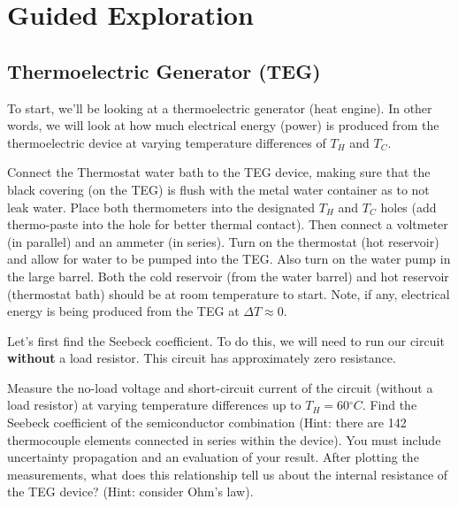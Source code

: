 \documentclass[
  letterpaper,
  DIV=11,
  numbers=noendperiod]{scrreprt}
\begin{document}

\hypertarget{guided-exploration}{%
\chapter{Guided Exploration}\label{guided-exploration}}

\hypertarget{thermoelectric-generator-teg}{%
\section{Thermoelectric Generator
(TEG)}\label{thermoelectric-generator-teg}}

To start, we'll be looking at a thermoelectric generator (heat engine).
In other words, we will look at how much electrical energy (power) is
produced from the thermoelectric device at varying temperature
differences of \(T_{H}\) and \(T_{C}\).

Connect the Thermostat water bath to the TEG device, making sure that
the black covering (on the TEG) is flush with the metal water container
as to not leak water. Place both thermometers into the designated
\(T_{H}\) and \(T_{C}\) holes (add thermo-paste into the hole for better
thermal contact). Then connect a voltmeter (in parallel) and an ammeter
(in series). Turn on the thermostat (hot reservoir) and allow for water
to be pumped into the TEG. Also turn on the water pump in the large
barrel. Both the cold reservoir (from the water barrel) and hot
reservoir (thermostat bath) should be at room temperature to start.
Note, if any, electrical energy is being produced from the TEG at
\(\Delta T \approx 0\).

Let's first find the Seebeck coefficient. To do this, we will need to
run our circuit \textbf{without} a load resistor. This circuit has
approximately zero resistance.

\begin{tcolorbox}[enhanced jigsaw, toprule=.15mm, coltitle=black, bottomrule=.15mm, colbacktitle=quarto-callout-note-color!10!white, opacitybacktitle=0.6, titlerule=0mm, colframe=quarto-callout-note-color-frame, title={Task 1}, leftrule=.75mm, bottomtitle=1mm, breakable, opacityback=0, arc=.35mm, left=2mm, colback=white, rightrule=.15mm, toptitle=1mm]

Measure the no-load voltage and short-circuit current of the circuit
(without a load resistor) at varying temperature differences up to
\(T_{H} = 60{^\circ}C\). Find the Seebeck coefficient of the
semiconductor combination (Hint: there are 142 thermocouple elements
connected in series within the device). You must include uncertainty
propagation and an evaluation of your result. After plotting the
measurements, what does this relationship tell us about the internal
resistance of the TEG device? (Hint: consider Ohm's law).

\end{tcolorbox}
\end{document}
